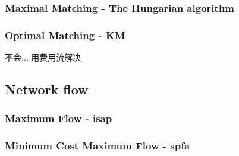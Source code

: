 		\subsubsection{Maximal Matching - The Hungarian algorithm}
			
		\subsubsection{Optimal Matching - KM}
			不会... 用费用流解决
	\subsection{Network flow}
		\subsubsection{Maximum Flow - isap}
			
		\subsubsection{Minimum Cost Maximum Flow - spfa}
			
		
